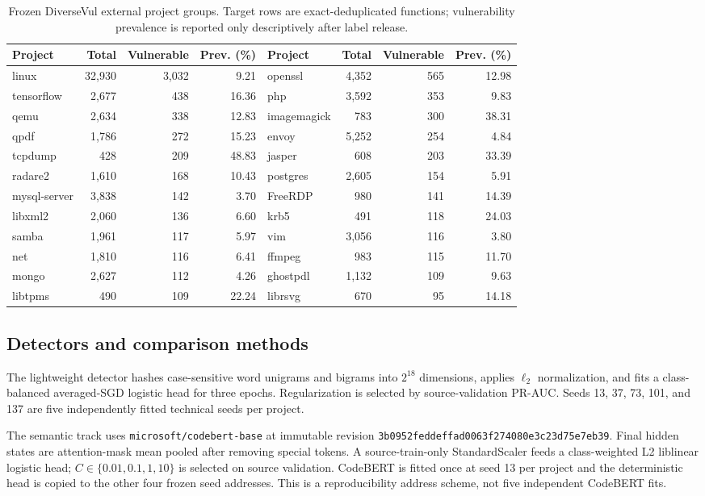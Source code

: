 \documentclass[research]{fcs}
\begin{document}
\begin{table}[t]
\centering
\caption{Frozen DiverseVul external project groups. Target rows are exact-deduplicated functions; vulnerability prevalence is reported only descriptively after label release.}
\label{tab:projects}
\small
\begin{tabular}{lrrr@{\qquad}lrrr}
\toprule
Project & Total & Vulnerable & Prev. (\%) & Project & Total & Vulnerable & Prev. (\%)\\
\midrule
linux & 32,930 & 3,032 & 9.21 & openssl & 4,352 & 565 & 12.98\\
tensorflow & 2,677 & 438 & 16.36 & php & 3,592 & 353 & 9.83\\
qemu & 2,634 & 338 & 12.83 & imagemagick & 783 & 300 & 38.31\\
qpdf & 1,786 & 272 & 15.23 & envoy & 5,252 & 254 & 4.84\\
tcpdump & 428 & 209 & 48.83 & jasper & 608 & 203 & 33.39\\
radare2 & 1,610 & 168 & 10.43 & postgres & 2,605 & 154 & 5.91\\
mysql-server & 3,838 & 142 & 3.70 & FreeRDP & 980 & 141 & 14.39\\
libxml2 & 2,060 & 136 & 6.60 & krb5 & 491 & 118 & 24.03\\
samba & 1,961 & 117 & 5.97 & vim & 3,056 & 116 & 3.80\\
net & 1,810 & 116 & 6.41 & ffmpeg & 983 & 115 & 11.70\\
mongo & 2,627 & 112 & 4.26 & ghostpdl & 1,132 & 109 & 9.63\\
libtpms & 490 & 109 & 22.24 & librsvg & 670 & 95 & 14.18\\
\bottomrule
\end{tabular}
\end{table}

\subsection{Detectors and comparison methods}

The lightweight detector hashes case-sensitive word unigrams and bigrams into $2^{18}$ dimensions, applies $\ell_2$ normalization, and fits a class-balanced averaged-SGD logistic head for three epochs. Regularization is selected by source-validation PR-AUC. Seeds 13, 37, 73, 101, and 137 are five independently fitted technical seeds per project.

The semantic track uses \texttt{microsoft/codebert-base} at immutable revision \texttt{3b0952feddeffad0063f274080e3c23d75e7eb39}. Final hidden states are attention-mask mean pooled after removing special tokens. A source-train-only StandardScaler feeds a class-weighted L2 liblinear logistic head; $C\in\{0.01,0.1,1,10\}$ is selected on source validation. CodeBERT is fitted once at seed 13 per project and the deterministic head is copied to the other four frozen seed addresses. This is a reproducibility address scheme, not five independent CodeBERT fits.
\end{document}

